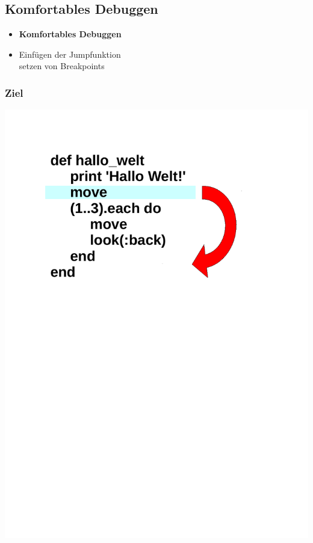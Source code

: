\subsection{Komfortables Debuggen}

\begin{frame}
	\begin{itemize}
		\item[]\textbf{Komfortables Debuggen} \\
		\item[]	Einfügen der Jumpfunktion\\
		setzen von Breakpoints\\ 	
	\end{itemize}
\end{frame}

\begin{frame}
	\frametitle{Ziel}
	\begin{center}
		\includegraphics[scale=0.4]{scopes/Jump1.pdf}
	\end{center}
\end{frame}	

